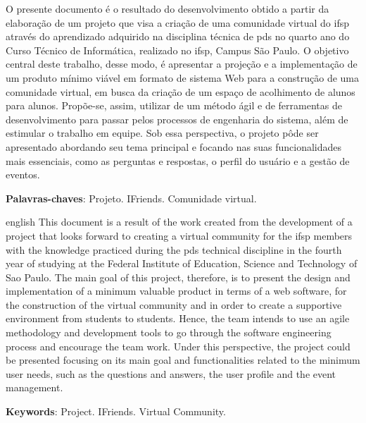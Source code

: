 
\setlength{\absparsep}{18pt} %
\begin{resumo}

O presente documento é o resultado do desenvolvimento obtido a partir da elaboração de um projeto que visa a criação de uma comunidade virtual do \acs{ifsp} através do aprendizado adquirido na disciplina técnica de \acs{pds} no quarto ano do Curso Técnico de Informática, realizado no \ac{ifsp}, Campus São Paulo.
O objetivo central deste trabalho, desse modo, é apresentar a projeção e a implementação de um produto mínimo viável em formato de sistema Web para a construção de uma comunidade virtual, em busca da criação de um espaço de acolhimento de alunos para alunos. Propõe-se, assim, utilizar de um método ágil e de ferramentas de desenvolvimento para passar pelos processos de engenharia do sistema, além de estimular o trabalho em equipe. Sob essa perspectiva, o projeto pôde ser apresentado abordando seu tema principal e focando nas suas funcionalidades mais essenciais, como as perguntas e respostas, o perfil do usuário e a gestão de eventos.


\textbf{Palavras-chaves}: Projeto. IFriends. Comunidade virtual.
\end{resumo}

\begin{resumo}[Abstract]
\begin{otherlanguage*}{english}
This document is a result of the work created from the development of a project that looks forward to creating a virtual community for the \acs{ifsp} members with the knowledge practiced during the \acs{pds} technical discipline in the fourth year of studying at the Federal Institute of Education, Science and Technology of Sao Paulo. The main goal of this project, therefore, is to present the design and implementation of a minimum valuable product in terms of a web software, for the construction of the virtual community and in order to create a supportive environment from students to students. Hence, the team intends to use an agile methodology and development tools to go through the software engineering process and encourage the team work. Under this perspective, the project could be presented focusing on its main goal and functionalities related to the minimum user needs, such as the questions and answers, the user profile and the event management.

  \vspace{\onelineskip}
  \noindent 
  \textbf{Keywords}: Project. IFriends. Virtual Community.
 \end{otherlanguage*}
\end{resumo}